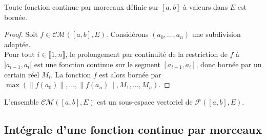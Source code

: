 \documentclass[french]{article}
\theoremstyle{plain}
\theoremstyle{definition}
\theoremstyle{remark}
\begin{document}
\begin{prop}%
	Toute fonction continue par morceaux définie sur $[a,b]$ à valeurs dans $E$ est bornée.
\end{prop}
\begin{proof}
	Soit $f\in\mathcal{CM}([a,b],E)$. Considérons $(a_0,\ldots,a_n)$ une subdivision adaptée.\\
	Pour tout $i\in\llbracket1,n\rrbracket$, le prolongement par continuité de la restriction de $f$ à $]a_{i-1},a_i[$ est une fonction continue sur le segment $[a_{i-1},a_i]$, donc bornée par un certain réel $M_i$. La fonction $f$ est alors bornée par $\max(\lVert f(a_0)\rVert,\ldots,\lVert f(a_n)\rVert,M_1,\ldots,M_n)$.
\end{proof}

\begin{prop}%
	L'ensemble $\mathcal{CM}([a,b],E)$ est un sous-espace vectoriel de $\mathcal{F}([a,b],E)$.
\end{prop}

\subsection{Intégrale d'une fonction continue par morceaux}
\end{document}
